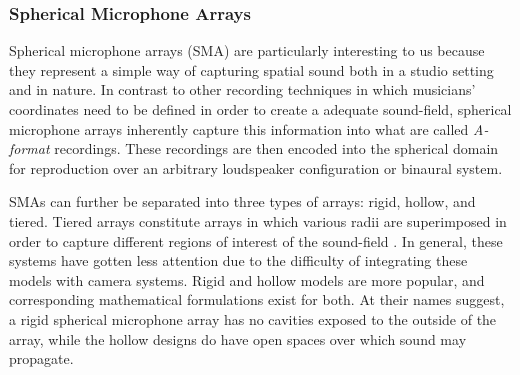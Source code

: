 


\subsubsection{Spherical Microphone Arrays}

Spherical microphone arrays (SMA) are particularly interesting to us because they represent a simple way of capturing spatial sound both in a studio setting and in nature. In contrast to other recording techniques in which musicians' coordinates need to be defined in order to create a adequate sound-field, spherical microphone arrays inherently capture this information into what are called \textit{A-format} recordings. These recordings are then encoded into the spherical domain for reproduction over an arbitrary loudspeaker configuration or binaural system. 

SMAs can further be separated into three types of arrays: rigid, hollow, and tiered. Tiered arrays constitute arrays in which various radii are superimposed in order to capture different regions of interest of the sound-field \cite{dabin2015design}. In general, these systems have gotten less attention due to the difficulty of integrating these models with camera systems. Rigid and hollow models are more popular, and corresponding mathematical formulations exist for both. At their names suggest, a rigid spherical microphone array has no cavities exposed to the outside of the array, while the hollow designs do have open spaces over which sound may propagate.

